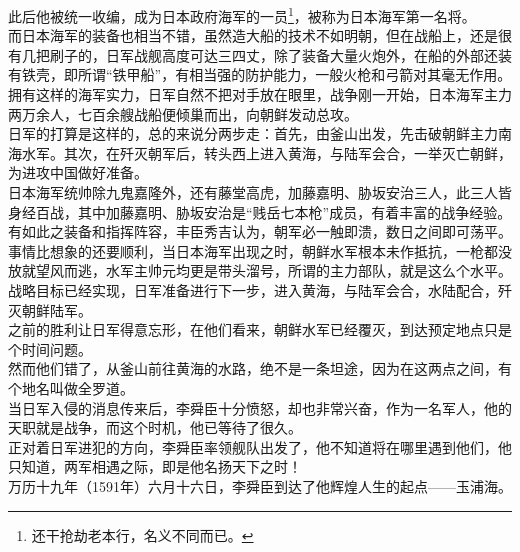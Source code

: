 \begin{multicols}{\theparacolNo}
此后他被统一收编，成为日本政府海军的一员\footnote{还干抢劫老本行，名义不同而已。}，被称为日本海军第一名将。\\

而日本海军的装备也相当不错，虽然造大船的技术不如明朝，但在战船上，还是很有几把刷子的，日军战舰高度可达三四丈，除了装备大量火炮外，在船的外部还装有铁壳，即所谓“铁甲船”，有相当强的防护能力，一般火枪和弓箭对其毫无作用。\\

拥有这样的海军实力，日军自然不把对手放在眼里，战争刚一开始，日本海军主力两万余人，七百余艘战船便倾巢而出，向朝鲜发动总攻。\\

日军的打算是这样的，总的来说分两步走：首先，由釜山出发，先击破朝鲜主力南海水军。其次，在歼灭朝军后，转头西上进入黄海，与陆军会合，一举灭亡朝鲜，为进攻中国做好准备。\\

日本海军统帅除九鬼嘉隆外，还有藤堂高虎，加藤嘉明、胁坂安治三人，此三人皆身经百战，其中加藤嘉明、胁坂安治是“贱岳七本枪”成员，有着丰富的战争经验。\\

有如此之装备和指挥阵容，丰臣秀吉认为，朝军必一触即溃，数日之间即可荡平。\\

事情比想象的还要顺利，当日本海军出现之时，朝鲜水军根本未作抵抗，一枪都没放就望风而逃，水军主帅元均更是带头溜号，所谓的主力部队，就是这么个水平。\\

战略目标已经实现，日军准备进行下一步，进入黄海，与陆军会合，水陆配合，歼灭朝鲜陆军。\\

之前的胜利让日军得意忘形，在他们看来，朝鲜水军已经覆灭，到达预定地点只是个时间问题。\\

然而他们错了，从釜山前往黄海的水路，绝不是一条坦途，因为在这两点之间，有个地名叫做全罗道。\\

当日军入侵的消息传来后，李舜臣十分愤怒，却也非常兴奋，作为一名军人，他的天职就是战争，而这个时机，他已等待了很久。\\

正对着日军进犯的方向，李舜臣率领舰队出发了，他不知道将在哪里遇到他们，他只知道，两军相遇之际，即是他名扬天下之时！\\

万历十九年（1591年）六月十六日，李舜臣到达了他辉煌人生的起点——玉浦海。\\


\end{multicols}
